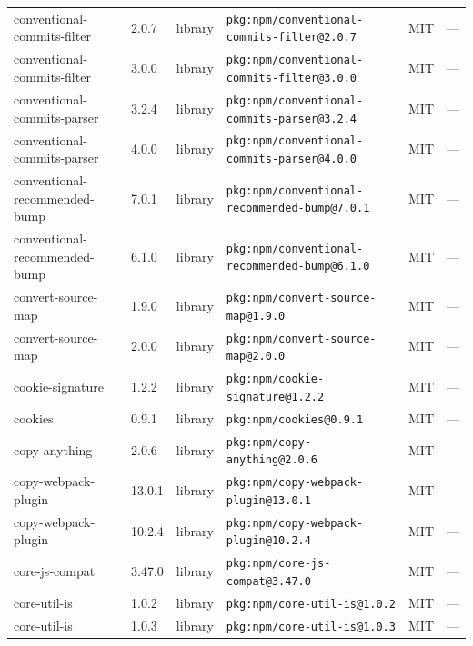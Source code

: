 \documentclass[11pt,a4paper]{article}
\begin{document}
\begin{longtable}{|p{4cm}|p{2cm}|p{1.6cm}|p{5cm}|p{1.5cm}|p{3.5cm}|}
\raggedright conventional-commits-filter & 2.0.7 & library & \small\texttt{pkg:npm/conventional-commits-filter@2.0.7} & MIT & \small — \\
\raggedright conventional-commits-filter & 3.0.0 & library & \small\texttt{pkg:npm/conventional-commits-filter@3.0.0} & MIT & \small — \\
\raggedright conventional-commits-parser & 3.2.4 & library & \small\texttt{pkg:npm/conventional-commits-parser@3.2.4} & MIT & \small — \\
\raggedright conventional-commits-parser & 4.0.0 & library & \small\texttt{pkg:npm/conventional-commits-parser@4.0.0} & MIT & \small — \\
\raggedright conventional-recommended-bump & 7.0.1 & library & \small\texttt{pkg:npm/conventional-recommended-bump@7.0.1} & MIT & \small — \\
\raggedright conventional-recommended-bump & 6.1.0 & library & \small\texttt{pkg:npm/conventional-recommended-bump@6.1.0} & MIT & \small — \\
\raggedright convert-source-map & 1.9.0 & library & \small\texttt{pkg:npm/convert-source-map@1.9.0} & MIT & \small — \\
\raggedright convert-source-map & 2.0.0 & library & \small\texttt{pkg:npm/convert-source-map@2.0.0} & MIT & \small — \\
\raggedright cookie-signature & 1.2.2 & library & \small\texttt{pkg:npm/cookie-signature@1.2.2} & MIT & \small — \\
\raggedright cookies & 0.9.1 & library & \small\texttt{pkg:npm/cookies@0.9.1} & MIT & \small — \\
\raggedright copy-anything & 2.0.6 & library & \small\texttt{pkg:npm/copy-anything@2.0.6} & MIT & \small — \\
\raggedright copy-webpack-plugin & 13.0.1 & library & \small\texttt{pkg:npm/copy-webpack-plugin@13.0.1} & MIT & \small — \\
\raggedright copy-webpack-plugin & 10.2.4 & library & \small\texttt{pkg:npm/copy-webpack-plugin@10.2.4} & MIT & \small — \\
\raggedright core-js-compat & 3.47.0 & library & \small\texttt{pkg:npm/core-js-compat@3.47.0} & MIT & \small — \\
\raggedright core-util-is & 1.0.2 & library & \small\texttt{pkg:npm/core-util-is@1.0.2} & MIT & \small — \\
\raggedright core-util-is & 1.0.3 & library & \small\texttt{pkg:npm/core-util-is@1.0.3} & MIT & \small — \\

\end{longtable}
\end{document}
